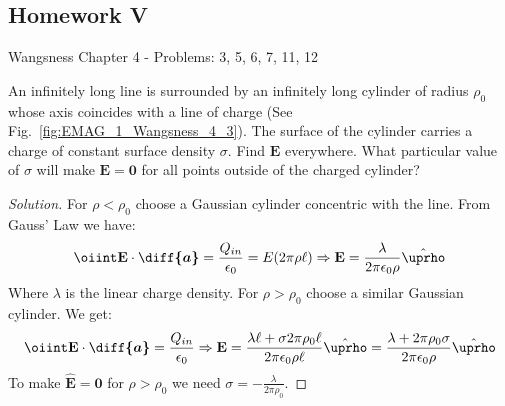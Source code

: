 \documentclass[crop=false,class=book,oneside]{standalone}
\begin{document}
        \subsection{Homework V}
            Wangsness Chapter 4 - Problems: 3, 5, 6, 7, 11, 12
            \begin{problem}[Wangsness 4-3]
                \label{problem:EMAG_wangsness_4_3}
                An infinitely long line is surrounded by an infinitely
                long cylinder of radius $\rho_{0}$ whose axis coincides
                with a line of charge
                (See Fig.~\ref{fig:EMAG_1_Wangsness_4_3}). The surface
                of the  cylinder carries a charge of constant surface
                density $\sigma$. Find $\mathbf{E}$ everywhere. What
                particular value of $\sigma$ will make
                $\mathbf{E}=\mathbf{0}$
                for all points outside of the charged cylinder?
            \end{problem}
            \begin{proof}[Solution]
                For $\rho<\rho_0$ choose a Gaussian cylinder concentric
                with the line. From Gauss' Law we have:
                \begin{equation*}
                    \oiint\mathbf{E}\cdot\boldsymbol{\diff{a}}
                    =\frac{Q_{in}}{\epsilon_0}
                    =E(2\pi\rho\ell)\Rightarrow
                    \mathbf{E}
                    =\frac{\lambda}{2\pi\epsilon_{0}\rho}
                    \hat{\boldsymbol{\uprho}}
                \end{equation*}
                Where $\lambda$ is the linear charge density.
                For $\rho>\rho_{0}$ choose a similar
                Gaussian cylinder. We get:
                \begin{equation*}
                    \oiint\mathbf{E}\cdot\boldsymbol{\diff{a}}
                    =\frac{Q_{in}}{\epsilon_{0}}
                    \Rightarrow\mathbf{E}
                    =\frac{\lambda\ell+\sigma 2\pi\rho_{0}\ell}
                    {2\pi\epsilon_{0}\rho\ell}\hat{\boldsymbol{\uprho}}
                    =\frac{\lambda+2\pi\rho_{0}\sigma}
                          {2\pi\epsilon_{0}\rho}
                    \hat{\boldsymbol{\uprho}}
                \end{equation*}
                To make $\hat{\mathbf{E}}=\mathbf{0}$
                for $\rho>\rho_{0}$ we need
                $\sigma=-\frac{\lambda}{2\pi\rho_{0}}$.
            \end{proof}
\end{document}
